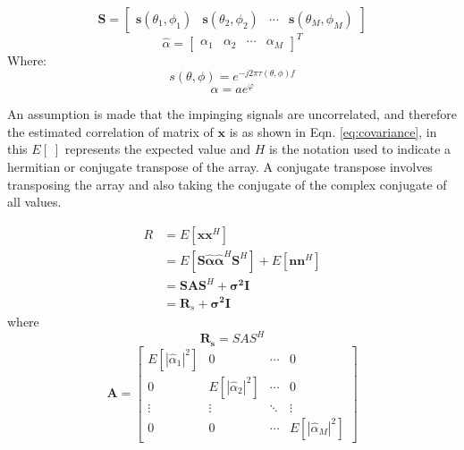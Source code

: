 \documentclass{UoNMCHA}
\numberwithin{equation}{section}
\begin{document}
    \begin{equation}
        \mathbf{S}=
        \begin{bmatrix}
            \mathbf{s}(\theta_1,\phi_1) & \mathbf{s}(\theta_2,\phi_2) & \cdots & \mathbf{s}(\theta_M,\phi_M)
        \end{bmatrix}
    \end{equation}
    \begin{equation}
        \hat{\alpha}=
        \begin{bmatrix}
        \alpha_1 & \alpha_2 & \cdots & \alpha_M
        \end{bmatrix}
        ^T
    \end{equation}
    Where:
    \begin{equation}
        s(\theta,\phi)=e^{-j2\pi \tau(\theta,\phi) f}
    \end{equation}
    \begin{equation}
        \alpha = ae^{\varphi}
    \end{equation}
    
    An assumption is made that the impinging signals are uncorrelated, and therefore the estimated correlation of matrix of $\mathbf{x}$ is as shown in Eqn. \ref{eq:covariance}, in this $E[\;]$ represents the expected value and $H$ is the notation used to indicate a hermitian or conjugate transpose of the array. A conjugate transpose involves transposing the array and also taking the conjugate of the complex conjugate of all values.
    
    \begin{equation}
    \begin{split}
        R & =  E[\mathbf{xx}^H] \\
        & = E[\mathbf{S\hat{\alpha}\hat{\alpha}}^H\mathbf{S}^H] + E[\mathbf{nn}^H] \\
        & = \mathbf{SAS}^H + \mathbf{\sigma^2I}\\
        & = \mathbf{R}_s + \mathbf{\sigma^2 I}
    \end{split}
    \label{eq:covariance}
    \end{equation}
    where
    \begin{equation}
        \mathbf{R_s} = SAS^H
    \end{equation}
    \begin{equation} 
    \mathbf{A} = 
    \begin{bmatrix}
        E[|\hat{\alpha}_1|^2] & 0 & \dotsm & 0\\ 
        0 & E[|\hat{\alpha}_2|^2] & \dotsm & 0\\ 
        \vdots & \vdots & \ddots & \vdots\\ 
        0 & 0 & \dotsm & E[|\hat{\alpha}_M|^2]
    \end{bmatrix}
    \end{equation}
    
\end{document}
